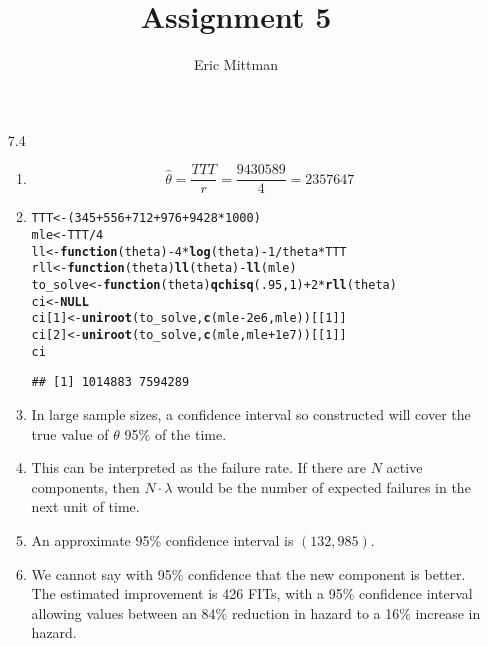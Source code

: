 \documentclass[12pt]{article}\usepackage[]{graphicx}\usepackage[]{color}
\author{Eric Mittman}
\title{Assignment 5}
\makeatletter
\newcommand{\hlnum}[1]{\textcolor[rgb]{0.686,0.059,0.569}{#1}}%
\newcommand{\hlopt}[1]{\textcolor[rgb]{0,0,0}{#1}}%
\newcommand{\hlstd}[1]{\textcolor[rgb]{0.345,0.345,0.345}{#1}}%
\newcommand{\hlkwa}[1]{\textcolor[rgb]{0.161,0.373,0.58}{\textbf{#1}}}%
\newcommand{\hlkwb}[1]{\textcolor[rgb]{0.69,0.353,0.396}{#1}}%
\newcommand{\hlkwc}[1]{\textcolor[rgb]{0.333,0.667,0.333}{#1}}%
\newcommand{\hlkwd}[1]{\textcolor[rgb]{0.737,0.353,0.396}{\textbf{#1}}}%
\newenvironment{kframe}{%
 \def\at@end@of@kframe{}%
 \ifinner\ifhmode%
  \def\at@end@of@kframe{\end{minipage}}%
  \begin{minipage}{\columnwidth}%
 \fi\fi%
 \def\FrameCommand##1{\hskip\@totalleftmargin \hskip-\fboxsep
 \colorbox{shadecolor}{##1}\hskip-\fboxsep
     \hskip-\linewidth \hskip-\@totalleftmargin \hskip\columnwidth}%
 \MakeFramed {\advance\hsize-\width
   \@totalleftmargin\z@ \linewidth\hsize
   \@setminipage}}%
 {\par\unskip\endMakeFramed%
 \at@end@of@kframe}
\newenvironment{knitrout}{}{} %
\makeatother
\begin{document}
  \maketitle
\begin{enumerate}
\item[7.4]
\begin{enumerate}
  \item
  \[\hat{\theta} = \frac{TTT}{r} = \frac{9430589}{4}=2357647\]
  \item
\begin{knitrout}
\color{fgcolor}\begin{kframe}
\begin{alltt}
\hlstd{TTT} \hlkwb{<-} \hlstd{(}\hlnum{345}\hlopt{+}\hlnum{556}\hlopt{+}\hlnum{712}\hlopt{+}\hlnum{976} \hlopt{+} \hlnum{9428}\hlopt{*}\hlnum{1000}\hlstd{)}
\hlstd{mle} \hlkwb{<-} \hlstd{TTT}\hlopt{/}\hlnum{4}
\hlstd{ll} \hlkwb{<-} \hlkwa{function}\hlstd{(}\hlkwc{theta}\hlstd{)} \hlopt{-}\hlnum{4} \hlopt{*} \hlkwd{log}\hlstd{(theta)} \hlopt{-} \hlnum{1}\hlopt{/}\hlstd{theta} \hlopt{*} \hlstd{TTT}
\hlstd{rll} \hlkwb{<-} \hlkwa{function}\hlstd{(}\hlkwc{theta}\hlstd{)} \hlkwd{ll}\hlstd{(theta)} \hlopt{-} \hlkwd{ll}\hlstd{(mle)}
\hlstd{to_solve} \hlkwb{<-} \hlkwa{function}\hlstd{(}\hlkwc{theta}\hlstd{)} \hlkwd{qchisq}\hlstd{(}\hlnum{.95}\hlstd{,}\hlnum{1}\hlstd{)} \hlopt{+} \hlnum{2} \hlopt{*} \hlkwd{rll}\hlstd{(theta)}
\hlstd{ci} \hlkwb{<-} \hlkwa{NULL}
\hlstd{ci[}\hlnum{1}\hlstd{]} \hlkwb{<-} \hlkwd{uniroot}\hlstd{(to_solve,} \hlkwd{c}\hlstd{(mle} \hlopt{-} \hlnum{2e6}\hlstd{,mle))[[}\hlnum{1}\hlstd{]]}
\hlstd{ci[}\hlnum{2}\hlstd{]} \hlkwb{<-} \hlkwd{uniroot}\hlstd{(to_solve,} \hlkwd{c}\hlstd{(mle,mle} \hlopt{+} \hlnum{1e7}\hlstd{))[[}\hlnum{1}\hlstd{]]}
\hlstd{ci}
\end{alltt}
\begin{verbatim}
## [1] 1014883 7594289
\end{verbatim}
\end{kframe}
\end{knitrout}
  \item
  In large sample sizes, a confidence interval so constructed will cover the true value of $\theta$ 95\% of the time.
  \item
This can be interpreted as the failure rate. If there are $N$ active components, then $N\cdot \lambda$ would be the number of expected failures in the next unit of time.
  \item
  An approximate 95\% confidence interval is $(132,985)$.
  \item
  We cannot say with 95\% confidence that the new component is better. The estimated improvement is 426 FITs, with a 95\% confidence interval allowing values between an 84\% reduction in hazard to a 16\% increase in hazard.
  

\end{enumerate}
\end{enumerate}
\end{document}
